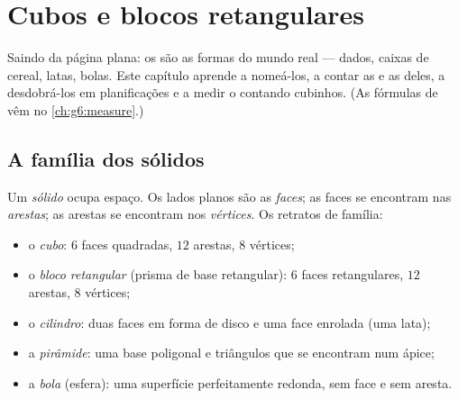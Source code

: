 \chapter{Cubos e blocos retangulares}\label{ch:g5:solids}

Saindo da página plana: os  são as formas do mundo real ---
dados, caixas de cereal, latas, bolas. Este capítulo aprende a
nomeá-los, a contar as  e as  deles, a desdobrá-los em
planificações e a medir o  contando cubinhos. (As fórmulas de
 vêm no \cref{ch:g6:measure}.)

\section{A família dos sólidos}

\begin{definition}\label{def:g5:solids:def}
Um \emph{sólido} ocupa espaço. Os lados planos são as
\emph{faces}; as faces se encontram nas
\emph{arestas}; as arestas se encontram nos
\emph{vértices}. Os retratos de família:
\begin{itemize}
  \item o \emph{cubo}: $6$ faces quadradas, $12$ arestas,
        $8$ vértices;
  \item o \emph{bloco retangular} (prisma de
        base retangular): $6$ faces retangulares, $12$ arestas, $8$
        vértices;
  \item o \emph{cilindro}: duas faces em forma de disco e uma face
        enrolada (uma lata);
  \item a \emph{pirâmide}: uma base poligonal e triângulos que se
        encontram num ápice;
  \item a \emph{bola} (esfera): uma superfície perfeitamente redonda,
        sem face e sem aresta.
\end{itemize}
\end{definition}

